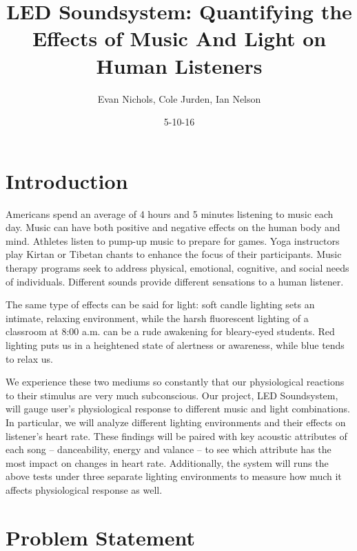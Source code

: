 \documentclass[11pt]{article}
\begin{document}
\begin{titlepage}
    \centering
    \title{LED Soundsystem: Quantifying the Effects of Music And Light on Human Listeners \\}
\date{5-10-16}
\author{Evan Nichols, Cole Jurden, Ian Nelson}
\end{titlepage}

\maketitle
\newpage
{}
\tableofcontents
\newpage

\section{Introduction}
Americans spend an average of 4 hours and 5 minutes listening to music each day.\cite{earshare} Music can have both positive and negative effects on the human body and mind. Athletes listen to pump-up music to prepare for games. Yoga instructors play Kirtan or Tibetan chants to enhance the focus of their participants. Music therapy programs seek to address physical, emotional, cognitive, and social needs of individuals. Different sounds provide different sensations to a human listener. 

The same type of effects can be said for light: soft candle lighting sets an intimate, relaxing environment, while the harsh fluorescent lighting of a classroom at 8:00 a.m. can be a rude awakening for bleary-eyed students. Red lighting puts us in a heightened state of alertness or awareness, while blue tends to relax us.

We experience these two mediums so constantly that our physiological reactions to their stimulus are very much subconscious. Our project, LED Soundsystem, will gauge user's physiological response to different music and light combinations. In particular, we will analyze different lighting environments and their effects on listener's heart rate. These findings will be paired with key acoustic attributes of each song -- danceability, energy and valance -- to see which attribute has the most impact on changes in heart rate. Additionally, the system will runs the above tests under three separate lighting environments to measure how much it affects physiological response as well.

\section{Problem Statement}
\end{document}
